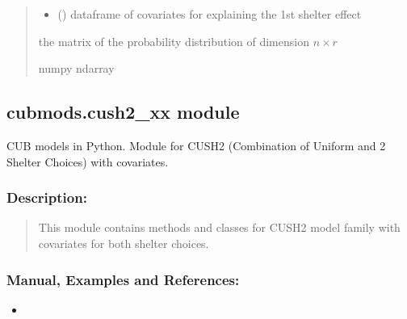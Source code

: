 \documentclass[letterpaper,10pt,english]{sphinxmanual}
\begin{document}
\begin{fulllineitems}
\begin{quote}
\begin{description}
\begin{itemize}
\item {} 
\sphinxAtStartPar
{} () \textendash{} dataframe of covariates for explaining the 1st shelter effect

\end{itemize}

\sphinxAtStartPar
the matrix of the probability distribution of dimension \(n \times r\)

\sphinxAtStartPar
numpy ndarray

\end{description}\end{quote}

\end{fulllineitems}



\subsection{cubmods.cush2\_xx module}
\label{\detokenize{cubmods:module-cubmods.cush2_xx}}\label{\detokenize{cubmods:cubmods-cush2-xx-module}}\label{\detokenize{cubmods:cush2xx-module}}
\sphinxAtStartPar
CUB models in Python.
Module for CUSH2 (Combination of Uniform
and 2 Shelter Choices) with covariates.


\subsubsection{Description:}
\label{\detokenize{cubmods:id58}}\begin{quote}

\sphinxAtStartPar
This module contains methods and classes
for CUSH2 model family with covariates for
both shelter choices.
\end{quote}


\subsubsection{Manual, Examples and References:}
\label{\detokenize{cubmods:id59}}\begin{itemize}
\item {} 
\sphinxAtStartPar
{}

\end{itemize}
\end{document}
